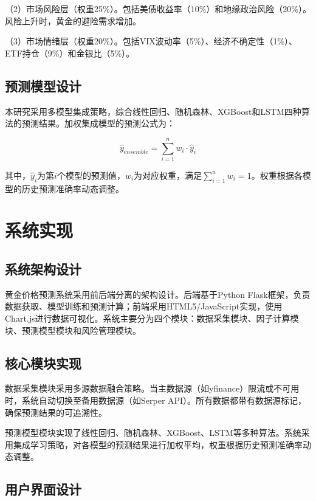 \documentclass[UTF8,a4paper,12pt]{ctexart}
\begin{document}
（2）市场风险层（权重25\%）。包括美债收益率（10\%）和地缘政治风险（20\%）。风险上升时，黄金的避险需求增加。

（3）市场情绪层（权重20\%）。包括VIX波动率（5\%）、经济不确定性（1\%）、ETF持仓（9\%）和金银比（5\%）。

\subsection{预测模型设计}

本研究采用多模型集成策略，综合线性回归、随机森林、XGBoost和LSTM四种算法的预测结果。加权集成模型的预测公式为：

\begin{equation}
\hat{y}_{ensemble} = \sum_{i=1}^{n} w_i \cdot \hat{y}_i
\end{equation}

其中，$\hat{y}_i$为第$i$个模型的预测值，$w_i$为对应权重，满足$\sum_{i=1}^{n} w_i = 1$。权重根据各模型的历史预测准确率动态调整。

\section{系统实现}

\subsection{系统架构设计}

黄金价格预测系统采用前后端分离的架构设计。后端基于Python Flask框架，负责数据获取、模型训练和预测计算；前端采用HTML5/JavaScript实现，使用Chart.js进行数据可视化。系统主要分为四个模块：数据采集模块、因子计算模块、预测模型模块和风险管理模块。

\subsection{核心模块实现}

数据采集模块采用多源数据融合策略。当主数据源（如yfinance）限流或不可用时，系统自动切换至备用数据源（如Serper API）。所有数据都带有数据源标记，确保预测结果的可追溯性。

预测模型模块实现了线性回归、随机森林、XGBoost、LSTM等多种算法。系统采用集成学习策略，对各模型的预测结果进行加权平均，权重根据历史预测准确率动态调整。

\subsection{用户界面设计}
\end{document}
